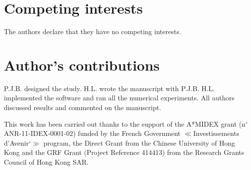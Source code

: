 \documentclass[twocolumn]{bmcart}
\begin{document}
\begin{backmatter}

\section*{Competing interests}
The authors declare that they have no competing interests.

\section*{Author's contributions}
P.J.B. designed the study. H.L. wrote the manuscript with P.J.B. H.L. implemented the software and ran all the numerical experiments. All authors discussed results and commented on the manuscript.

This work has been carried out thanks to the support of the A*MIDEX grant (n$^{\circ}$ ANR-11-IDEX-0001-02) funded by the French Government $\ll$Investissements d’Avenir`$\gg$ program, the Direct Grant from the Chinese University of Hong Kong and the GRF Grant (Project Reference 414413) from the Research Grants Council of Hong Kong SAR.






\end{backmatter}
\end{document}
